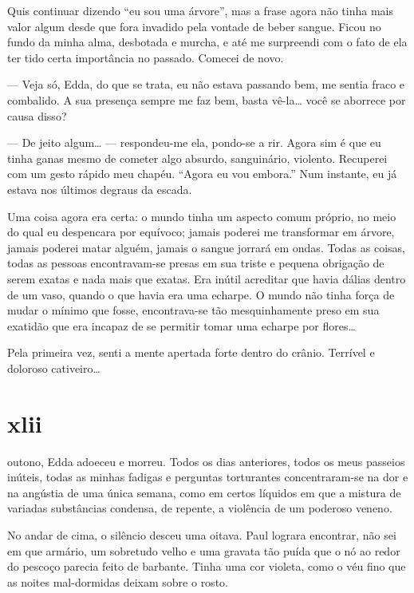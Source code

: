 Quis continuar dizendo ``eu sou uma árvore'', mas a frase agora não tinha mais
valor algum desde que fora invadido pela vontade de beber sangue. Ficou no
fundo da minha alma, desbotada e murcha, e até me surpreendi com o fato de
ela ter tido certa importância no passado. Comecei de novo.

--- Veja só, Edda, do que se trata, eu não estava passando bem, me sentia
    fraco e combalido. A sua presença sempre me faz bem, basta vê-la\ldots
    {} você se aborrece por causa disso?

--- De jeito algum\ldots{} --- respondeu-me ela, pondo-se a rir. Agora sim é
    que eu tinha ganas mesmo de cometer algo absurdo, sanguinário, violento.
    Recuperei com um gesto rápido meu chapéu. ``Agora eu vou embora.'' Num
    instante, eu já estava nos últimos degraus da escada.

Uma coisa agora era certa: o mundo tinha um aspecto comum próprio, no meio do
qual eu despencara por equívoco; jamais poderei me transformar em árvore,
jamais poderei matar alguém, jamais o sangue jorrará em ondas. Todas as
coisas, todas as pessoas encontravam-se presas em sua triste e pequena
obrigação de serem exatas e nada mais que exatas. Era inútil acreditar que
havia dálias dentro de um vaso, quando o que havia era uma echarpe. O mundo
não tinha força de mudar o mínimo que fosse, encontrava-se tão mesquinhamente
preso em sua exatidão que era incapaz de se permitir tomar uma echarpe por
flores\ldots{}

Pela primeira vez, senti a mente apertada forte dentro do crânio. Terrível e
doloroso cativeiro\ldots{}


\section{xlii} 

 outono, Edda adoeceu e morreu. Todos os dias anteriores,
 todos os meus passeios inúteis, todas as minhas fadigas e perguntas
 torturantes concentraram-se na dor e na angústia de uma única semana, como
 em certos líquidos em que a mistura de variadas substâncias condensa, de
 repente, a violência de um poderoso veneno.

No andar de cima, o silêncio desceu uma oitava. Paul lograra encontrar, não
sei em que armário, um sobretudo velho e uma gravata tão puída que o nó ao
redor do pescoço parecia feito de barbante. Tinha uma cor violeta, como o véu
fino que as noites mal-dormidas deixam sobre o rosto.

